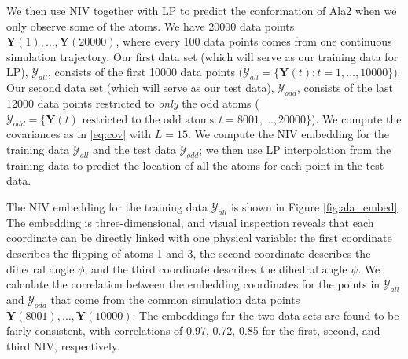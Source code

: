 \documentclass[aip,jcp,preprint]{revtex4-1}
\begin{document}

We then use NIV together with LP to predict the conformation of Ala2 when we only observe some of the atoms.
%
We have 20000 data points $\mathbf{Y}(1), \dots, \mathbf{Y}(20000)$, where every 100 data points comes from one continuous simulation trajectory.
%
Our first data set (which will serve as our training data for LP), $\mathcal{Y}_{all}$,
consists of the first 10000 data points ($\mathcal{Y}_{all} = \{\mathbf{Y}(t): t=1, \dots, 10000\}$).
%
Our second data set (which will serve as our test data), $\mathcal{Y}_{odd}$, consists of the last 12000 data points restricted to {\em only} the odd atoms
($\mathcal{Y}_{odd} = \{ \mathbf{Y}(t) \text{ restricted to the odd atoms}: t = 8001, \dots, 20000\}$).
%
We compute the covariances as in \eqref{eq:cov} with $L=15$.
%
We compute the NIV embedding for the training data $\mathcal{Y}_{all}$ and the test data $\mathcal{Y}_{odd}$; we then use LP interpolation from the training data to predict the location of all the atoms for each point in the test data.

The NIV embedding for the training data $\mathcal{Y}_{all}$ is shown in Figure \ref{fig:ala_embed}.
%
The embedding is three-dimensional, and visual inspection reveals that each coordinate can be directly linked with one physical variable:
the first coordinate describes the flipping of atoms 1 and 3, the second coordinate describes the dihedral angle $\phi$, and the third coordinate describes the dihedral angle $\psi$.
%
We calculate the correlation between the embedding coordinates for the points in $\mathcal{Y}_{all}$ and $\mathcal{Y}_{odd}$
that come from the common simulation data points $\mathbf{Y}(8001), \dots, \mathbf{Y}(10000)$.
%
The embeddings for the two data sets are found to be fairly consistent, with correlations of 0.97, 0.72, 0.85 for the first, second, and third NIV, respectively.
\end{document}
